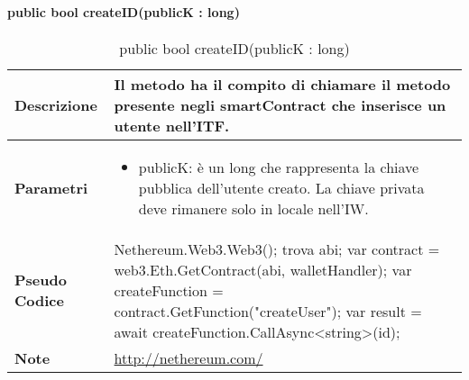 \paragraph{public bool createID(publicK : long)}
\begin{center}
    \begin{longtable}{|p{3cm}|p{9cm}|}%
    \caption{public bool createID(publicK : long)}
    \label{tab:public-bool-createIDImpl}
    \endfirsthead
    \endhead
    \hline
    \textbf{Descrizione} & Il metodo ha il compito di chiamare il metodo presente negli smartContract che inserisce un utente nell’ITF.\\
    \hline
    \textbf{Parametri} &      
    \begin{itemize}
        \item publicK: è un long che rappresenta la chiave pubblica dell’utente creato. La chiave privata deve rimanere solo in locale nell’IW.
    \end{itemize} 
    \\
    \hline
    \textbf{Pseudo Codice} & 
    Nethereum.Web3.Web3();\newline
    trova abi;\newline
    var contract = web3.Eth.GetContract(abi, walletHandler);\newline
    var createFunction = contract.GetFunction("createUser");\newline
    var result = await createFunction.CallAsync<string>(id);\newline
    \\
    \hline
    \textbf{Note} & \url{http://nethereum.com/} \\
    \hline
    \end{longtable}
    \end{center}



